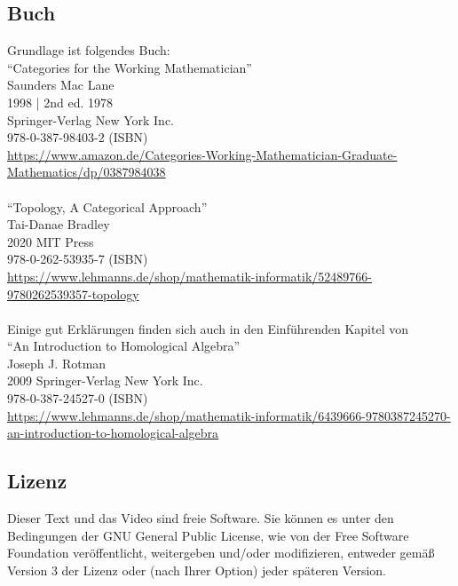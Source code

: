 \documentclass[a4paper]{amsart}
\theoremstyle{definition}
\begin{document}
\subsection*{Buch}
Grundlage ist folgendes Buch:\\
"`Categories for the Working Mathematician"'\\
Saunders Mac Lane\\
1998 | 2nd ed. 1978\\
Springer-Verlag New York Inc.\\
978-0-387-98403-2 (ISBN)\\
{\tiny
   \url{https://www.amazon.de/Categories-Working-Mathematician-Graduate-Mathematics/dp/0387984038}}\\
\\
"`Topology, A Categorical Approach"'\\
Tai-Danae Bradley\\
2020 MIT Press\\
978-0-262-53935-7 (ISBN)\\ 
{\tiny
\url{https://www.lehmanns.de/shop/mathematik-informatik/52489766-9780262539357-topology}}\\
\\
Einige gut Erklärungen finden sich auch in den Einführenden Kapitel von\\
"`An Introduction to Homological Algebra"'\\
Joseph J. Rotman\\
2009 Springer-Verlag New York Inc.\\
978-0-387-24527-0 (ISBN)\\ 
{\tiny \url{https://www.lehmanns.de/shop/mathematik-informatik/6439666-9780387245270-an-introduction-to-homological-algebra}}\\

\subsection*{Lizenz}
Dieser Text und das Video sind freie Software. Sie können es unter den Bedingungen der 
GNU General Public License, wie von der Free Software Foundation veröffentlicht, weitergeben 
und/oder modifizieren, entweder gemäß Version 3 der Lizenz oder (nach Ihrer Option) jeder späteren Version.
\end{document}
